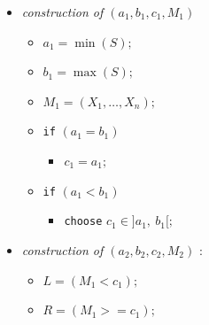 \documentclass[
  11pt,
  a4paper,
]{article}
\begin{document}
\begin{itemize}
	\item[Step-1]  \textit{construction of $\left(a_1,b_1,c_1,M_1 \right)$ }
	\begin{itemize}
		\item[$\bullet$] $a_1=\min(S);$
		\item[$\bullet$]  $b_1=\max(S);$
		\item[$\bullet$]  $M_1=(X_1,\ldots,X_n);$
		
		\item[$\bullet$] \texttt{if} $(a_1=b_1)$
		\begin{itemize}
			\item[$\circ$] $c_1= a_1;$
		\end{itemize}
		\item[$\bullet$] \texttt{if} $(a_1<b_1)$ 
		\begin{itemize}     
			\item[$\circ$] \texttt{choose} $c_1\in ]a_1,\ b_1[;$	
		\end{itemize}			
	\end{itemize}            
	
	
	
	\item[Step-2]  \textit{construction of $\left(a_2,b_2,c_2,M_2 \right)$ }: 
	\begin{itemize}
		\item[$\bullet$] $L=(M_1<c_1);$
		\item[$\bullet$] $R=(M_1>=c_1);$ 	           
		

\end{itemize}
\end{itemize}
\end{document}
